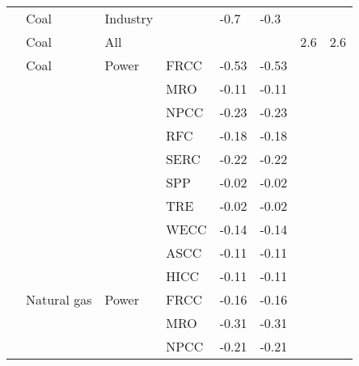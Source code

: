 \begin{ThreePartTable}
\begin{longtable}{ >{\raggedright}p{9em} l l l l l l l }
    \cite{burke_is_2015}                                 & Coal          & Industry    &      & -0.7    & -0.3    &         &        \\ 
    \cite{erickson_would_2018}                           & Coal          & All         &      &         &         & 2.6     & 2.6    \\ 
    \cite{us_energy_information_administration_fuel_2012}& Coal          & Power       & FRCC & -0.53   & -0.53   &         &        \\
                                                          &               &             & MRO  & -0.11   & -0.11   &         &        \\
                                                          &               &             & NPCC & -0.23   & -0.23   &         &        \\
                                                          &               &             & RFC  & -0.18   & -0.18   &         &        \\
                                                          &               &             & SERC & -0.22   & -0.22   &         &        \\
                                                          &               &             & SPP  & -0.02   & -0.02   &         &        \\
                                                          &               &             & TRE  & -0.02   & -0.02   &         &        \\
                                                          &               &             & WECC & -0.14   & -0.14   &         &        \\
                                                          &               &             & ASCC & -0.11   & -0.11   &         &        \\
                                                          &               &             & HICC & -0.11   & -0.11   &         &        \\
                                                          & Natural gas   & Power       & FRCC & -0.16   & -0.16   &         &        \\
                                                          &               &             & MRO  & -0.31   & -0.31   &         &        \\
                                                          &               &             & NPCC & -0.21   & -0.21   &         &        \\

\end{longtable}
\end{ThreePartTable}
